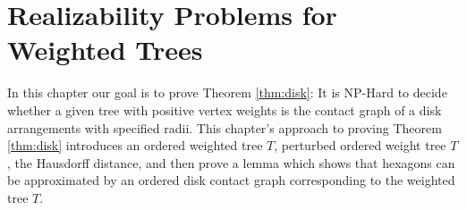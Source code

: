 \chapter{Realizability Problems for Weighted Trees}\label{chp:disk}

In this chapter our goal is to prove Theorem \ref{thm:disk}: It is NP-Hard to decide whether a given tree with positive vertex weights is the contact graph of a disk arrangements with specified radii.   
This chapter's approach to proving Theorem \ref{thm:disk} introduces an ordered weighted tree $T$, perturbed ordered weight tree $T$, the Hausdorff distance, and then prove a lemma which shows that hexagons can be approximated by an ordered disk contact graph corresponding to the weighted tree $T$.
